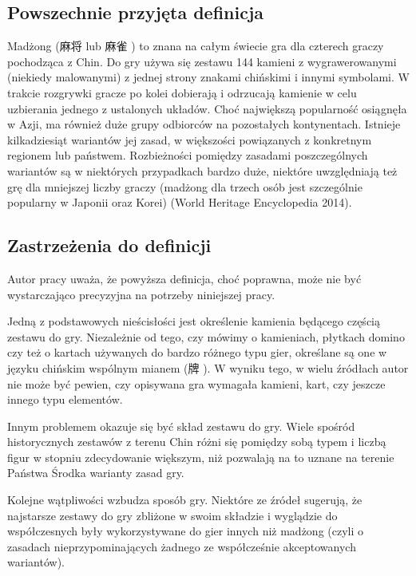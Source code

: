 \subsection{Powszechnie przyjęta definicja}
Madżong (麻将  lub 麻雀 ) to znana na całym świecie
gra dla czterech graczy pochodząca z Chin. Do gry używa się zestawu 144 kamieni
z wygrawerowanymi (niekiedy malowanymi) z jednej strony znakami chińskimi i
innymi symbolami. W trakcie rozgrywki gracze po kolei dobierają i odrzucają
kamienie w celu uzbierania jednego z ustalonych układów. Choć największą
popularność osiągnęła w Azji, ma również duże grupy odbiorców na pozostałych
kontynentach.
Istnieje kilkadziesiąt wariantów jej zasad, w większości powiązanych z
konkretnym regionem lub państwem. Rozbieżności pomiędzy zasadami poszczególnych
wariantów są w niektórych przypadkach bardzo duże, niektóre uwzględniają też grę
dla mniejszej liczby graczy (madżong dla trzech osób jest szczególnie popularny
w Japonii oraz Korei) (World Heritage Encyclopedia 2014).
\subsection{Zastrzeżenia do definicji}
\label{zastrzezenia}
Autor pracy uważa, że powyższa definicja, choć poprawna, może nie być
wystarczająco precyzyjna na potrzeby niniejszej pracy.

Jedną z podstawowych nieścisłości jest określenie kamienia będącego częścią
zestawu do gry.
Niezależnie od tego, czy mówimy o kamieniach, płytkach domino czy też o kartach
używanych do bardzo różnego typu gier, określane są one w języku chińskim
wspólnym mianem  (牌 ). W wyniku tego, w wielu źródłach
autor nie może być pewien, czy opisywana gra wymagała kamieni, kart, czy jeszcze
innego typu elementów.

Innym problemem okazuje się być skład zestawu do gry. Wiele spośród
historycznych zestawów z terenu Chin różni się pomiędzy sobą typem i liczbą
figur w stopniu zdecydowanie większym, niż pozwalają na to uznane na terenie
Państwa Środka warianty zasad gry.

Kolejne wątpliwości wzbudza sposób gry. Niektóre ze źródeł sugerują, że
najstarsze zestawy do gry zbliżone w swoim składzie i wyglądzie do współczesnych
były wykorzystywane do gier innych niż madżong (czyli o zasadach
nieprzypominających żadnego ze współcześnie akceptowanych wariantów).

